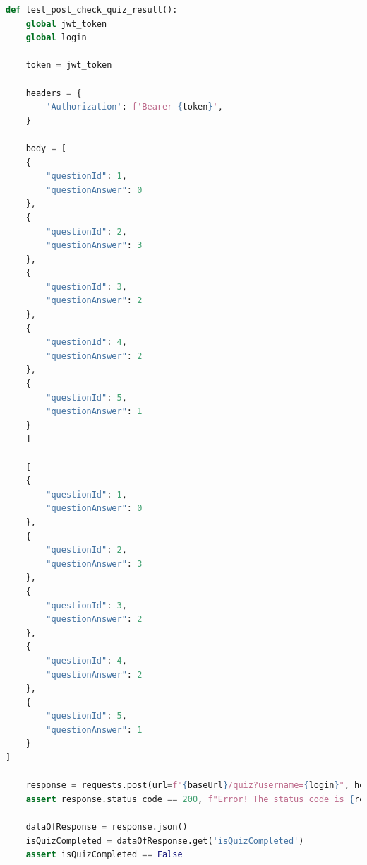 \documentclass[a4paper, 12pt]{article}
\begin{document}
\begin{lstlisting}[language=python, caption={Код для тестирования API}]
def test_post_check_quiz_result():
    global jwt_token
    global login

    token = jwt_token

    headers = {
        'Authorization': f'Bearer {token}',
    }    

    body = [
    {
        "questionId": 1,
        "questionAnswer": 0
    },
    {
        "questionId": 2,
        "questionAnswer": 3
    },
    {
        "questionId": 3,
        "questionAnswer": 2
    },
    {
        "questionId": 4,
        "questionAnswer": 2
    },
    {
        "questionId": 5,
        "questionAnswer": 1
    }
    ]

    [
    {
        "questionId": 1,
        "questionAnswer": 0
    },
    {
        "questionId": 2,
        "questionAnswer": 3
    },
    {
        "questionId": 3,
        "questionAnswer": 2
    },
    {
        "questionId": 4,
        "questionAnswer": 2
    },
    {
        "questionId": 5,
        "questionAnswer": 1
    }
]

    response = requests.post(url=f"{baseUrl}/quiz?username={login}", headers=headers, json=body)
    assert response.status_code == 200, f"Error! The status code is {response.status_code}"

    dataOfResponse = response.json()
    isQuizCompleted = dataOfResponse.get('isQuizCompleted')
    assert isQuizCompleted == False    
    
\end{lstlisting}
\end{document}
